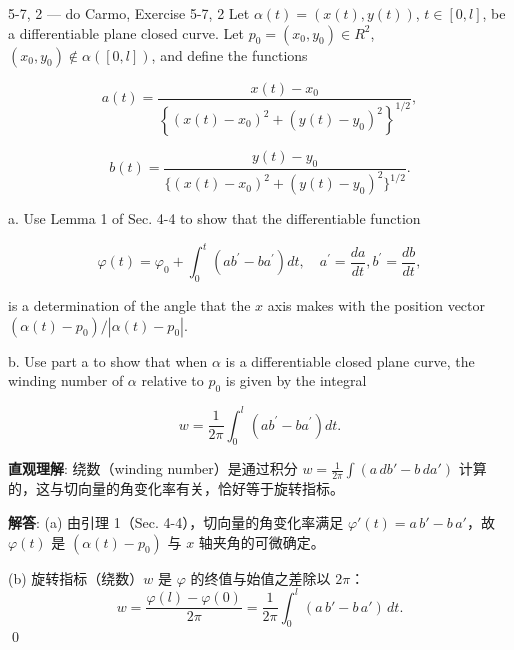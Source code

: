 \begin{exercise}{5-7, 2 — do Carmo, Exercise 5-7, 2}
Let $\alpha(t) = (x(t), y(t))$, $t \in [0, l]$, be a differentiable plane closed curve. Let $p_0 = (x_0, y_0) \in R^2$, $(x_0, y_0) \notin \alpha([0, l])$, and define the functions

$$
a (t) = \frac {x (t) - x _ {0}}{\left\{(x (t) - x _ {0}) ^ {2} + (y (t) - y _ {0}) ^ {2} \right\} ^ {1 / 2}},
$$

$$
b (t) = \frac {y (t) - y _ {0}}{\{(x (t) - x _ {0}) ^ {2} + (y (t) - y _ {0}) ^ {2} \} ^ {1 / 2}}.
$$

a. Use Lemma 1 of Sec. 4-4 to show that the differentiable function

$$
\varphi (t) = \varphi_ {0} + \int_ {0} ^ {t} \left(a b ^ {\prime} - b a ^ {\prime}\right) d t, \quad a ^ {\prime} = \frac {d a}{d t}, b ^ {\prime} = \frac {d b}{d t},
$$

is a determination of the angle that the $x$ axis makes with the position vector $(\alpha(t) - p_0) / |\alpha(t) - p_0|$.

b. Use part a to show that when $\alpha$ is a differentiable closed plane curve, the winding number of $\alpha$ relative to $p_0$ is given by the integral

$$
w = \frac {1}{2 \pi} \int_ {0} ^ {l} (a b ^ {\prime} - b a ^ {\prime}) d t.
$$
\end{exercise}
\begin{solution}
\textbf{直观理解}: 绕数（winding number）是通过积分 $w=\frac{1}{2\pi}\int(a\,db' - b\,da')$ 计算的，这与切向量的角变化率有关，恰好等于旋转指标。

\textbf{解答}: (a) 由引理 1（Sec. 4-4），切向量的角变化率满足 $\varphi'(t)=a\,b'-b\,a'$，故 $\varphi(t)$ 是 $(\alpha(t)-p_0)$ 与 $x$ 轴夹角的可微确定。

(b) 旋转指标（绕数）$w$ 是 $\varphi$ 的终值与始值之差除以 $2\pi$：
\[
w = \frac{\varphi(l)-\varphi(0)}{2\pi} = \frac{1}{2\pi}\int_0^l(a\,b'-b\,a')\,dt.
\]
\qed
\end{solution}


